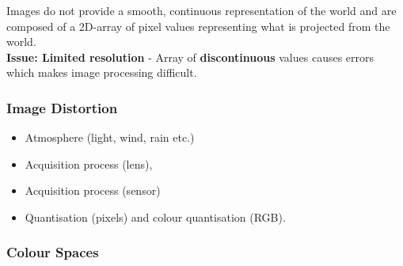 \documentclass[english, 10pt]{article}
\begin{document}
  Images do not provide a smooth, continuous representation of the
  world and are composed of a 2D-array of pixel values representing what is
  projected from the world.  \\

 \textbf{Issue: Limited resolution} - Array of \textbf{discontinuous} values causes errors which makes image processing difficult.

\subsubsection{Image Distortion}

  \begin{itemize}
  \itemsep1pt\parskip0pt
  \item Atmosphere (light, wind, rain etc.)
    \item Acquisition process (lens), 
    \item Acquisition process (sensor)
    \item Quantisation (pixels) and colour quantisation (RGB).
  \end{itemize}

\subsubsection{Colour Spaces}\label{colour-spaces}
\end{document}
